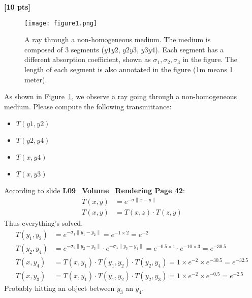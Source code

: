 \documentclass[11pt,addpoints,answers]{exam}
\begin{document}
\begin{questions}
    \question \textbf{[10 pts]}
    \begin{figure}[h]
        \centering
        \texttt{[image: figure1.png]}
        \caption{A ray through a non-homogeneous medium. The medium is composed of 3 segments ($y1y2$, $y2y3$, $y3y4$). Each segment has a different absorption coefficient, shown as $\sigma_1, \sigma_2, \sigma_3$ in the figure. The length of each segment is also annotated in the figure (1m means 1 meter).}
        \label{fig:q1}
    \end{figure}

    As shown in Figure~\ref{fig:q1}, we observe a ray going through a non-homogeneous medium.
    Please compute the following transmittance:
    \begin{itemize}
        \item $T(y1, y2)$
        \item  $T(y2, y4)$
        \item $T(x, y4)$
        \item $T(x, y3)$
    \end{itemize}

    \begin{tcolorbox}[fit,height=20cm, width=\textwidth, blank, borderline={0.5pt}{-2pt},halign=left, valign=center, nobeforeafter]
        \begin{studentsolution}
            According to slide \textbf{L09\_Volume\_Rendering Page 42}:
            \begin{align*}
                T(x, y) & = e^{-\sigma \|x - y\|} \\
                T(x, y) & = T(x, z) \cdot T(z, y)
            \end{align*}
            Thus everything's solved.
            \begin{align*}
                T(y_1, y_2) & = e^{-\sigma_1 \| y_1 - y_2 \|} = e^{-1 \times 2} = e^{-2}                                                                 \\
                T(y_2, y_4) & = e^{-\sigma_2 \| y_2 - y_3 \|} \cdot e^{-\sigma_3 \| y_3 - y_4 \|} = e^{-0.5 \times 1} \cdot e^{-10 \times 3} = e^{-30.5} \\
                T(x, y_4)   & = T(x, y_1) \cdot T(y_1, y_2) \cdot T(y_2, y_4) = 1 \times e^{-2} \times e^{-30.5} = e^{-32.5}                             \\
                T(x, y_3)   & = T(x, y_1) \cdot T(y_1, y_2) \cdot T(y_2, y_3) = 1 \times e^{-2} \times e^{-0.5} = e^{-2.5}
            \end{align*}
            Probably hitting an object between $y_3$ an $y_4$.
        \end{studentsolution}
    \end{tcolorbox}
\end{questions}
\end{document}
